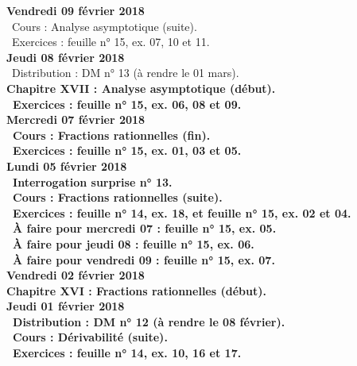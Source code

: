 \documentclass[12pt,a4paper]{article}
\begin{document}
\noindent\textbf{Vendredi 09 février 2018}\\
\bu\ Cours : Analyse asymptotique (suite).\\
\bu\ Exercices : feuille n° 15, ex. 07, 10 et 11.\vspace{.4cm}\\

\noindent\textbf{Jeudi 08 février 2018}\\
\bu\ Distribution : DM n° 13 (à rendre le 01 mars).\\
\bf Chapitre XVII \rm : Analyse asymptotique (début).\\
\bu\ Exercices : feuille n° 15, ex. 06, 08 et 09.\vspace{.4cm}\\

\noindent\textbf{Mercredi 07 février 2018} \\
\bu\ Cours : Fractions rationnelles (fin).\\
\bu\ Exercices : feuille n° 15, ex. 01, 03 et 05.\vspace{.4cm}\\

\noindent\textbf{\bf Lundi 05 février 2018} \\
\bu\ Interrogation surprise n° 13.\\
\bu\ Cours : Fractions rationnelles (suite).\\
\bu\ Exercices : feuille n° 14, ex. 18, et feuille n° 15, ex. 02 et 04.\\
\bu\ À faire pour mercredi 07 : feuille n° 15, ex. 05.\\
\bu\ À faire pour jeudi 08 : feuille n° 15, ex. 06.\\
\bu\ À faire pour vendredi 09 : feuille n° 15, ex. 07.\vspace{.4cm}\\

\noindent\textbf{Vendredi 02 février 2018}\\
\bf Chapitre XVI \rm : Fractions rationnelles (début).\vspace{.4cm}\\

\noindent\textbf{Jeudi 01 février 2018}\\
\bu\ Distribution : DM n° 12 (à rendre le 08 février).\\
\bu\ Cours : Dérivabilité (suite).\\
\bu\ Exercices : feuille n° 14, ex. 10, 16 et 17.\vspace{.4cm}\\
\end{document}
